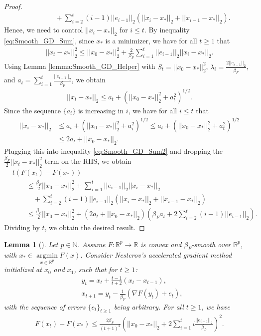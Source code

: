 \documentclass{article}
\newtheorem{lemma}{Lemma}
\begin{document}
\begin{proof}
\begin{align}
& \qquad \quad + \sum_{i = 2}^t(i - 1)||e_{i - 1}||_2(||x_i - x_*||_2 + ||x_{i - 1} - x_*||_2).
\end{align}
Hence, we need to control $||x_i - x_*||_2$ for $i \leq t$. By inequality \eqref{eq:Smooth_GD_Sum}, since $x_*$ is a minimizer, we have for all $t \geq 1$ that
\begin{align*}
||x_t - x_*||_2^2 \leq ||x_0 - x_*||_2^2 + \frac{2}{\beta_F}\sum_{i = 1}^t||e_{i - 1}||_2||x_i - x_*||_2. 
\end{align*}
Using Lemma \ref{lemma:Smooth_GD_Helper} with $S_t = ||x_0 - x_*||_2^2$,  $\lambda_i = \frac{2||e_{i - 1}||_2}{\beta_F}$, and $a_t = \sum_{i = 1}^t\frac{||e_{i - 1}||_2}{\beta_F}$, we obtain
\begin{align*}
||x_t - x_*||_2 \leq a_t + \left(||x_0 - x_*||_2^2 + a_t^2\right)^{1/2}.
\end{align*}
Since the sequence $\{a_i\}$ is increasing in $i$, we have for all $i \leq t$ that
\begin{align*}
||x_i - x_*||_2 &\leq a_i + \left(||x_0 - x_*||_2^2 + a_i^2\right)^{1/2} \leq a_t + \left(||x_0 - x_*||_2^2 + a_t^2\right)^{1/2}\\
&\leq 2a_t + ||x_0 - x_*||_2.
\end{align*}
Plugging this into inequality \eqref{eq:Smooth_GD_Sum2} and dropping the $\frac{\beta_F}{2}||x_t - x_*||_2^2$ term on the RHS, we obtain
\begin{align*}
& t(F(x_t) - F(x_*)) \\
%
& \qquad \leq \frac{\beta_F}{2}||x_0 - x_*||_2^2 + \sum_{i = 1}^t||e_{i - 1}||_2||x_i - x_*||_2\\
& \qquad \quad + \sum_{i = 2}^t(i - 1)||e_{i - 1}||_2(||x_i - x_*||_2 + ||x_{i - 1} - x_*||_2)\\
& \qquad \leq \frac{\beta_F}{2}||x_0 - x_*||_2^2 + (2a_t + ||x_0 - x_*||_2)\left(\beta_Fa_t + 2\sum_{i = 2}^t(i - 1)||e_{i - 1}||_2\right).
\end{align*}
Dividing by $t$, we obtain the desired result.
\end{proof}

\begin{lemma}[\cite{Schmidt_2011_Conv}]
\label{lemma:Inexact_AGD_lemma}
Let $p \in \mathbb{N}$. Assume $F : \mathbb{R}^p \rightarrow \mathbb{R}$ is convex and $\beta_F$-smooth over $\mathbb{R}^p$, with $x_* \in \mathop{\arg\min}\limits_{x \in \mathbb{R}^p}F(x)$. Consider Nesterov's accelerated gradient method initialized at $x_0$ and $x_1$, such that for $t \geq 1$:
\begin{align*}
&y_t = x_t + \frac{t - 1}{t + 2}(x_t - x_{t - 1}),\\
&x_{t + 1} = y_t - \frac{1}{\beta_F}(\nabla F(y_t) + e_t),
\end{align*}
with the sequence of errors $\{e_{t}\}_{t \geq 1}$ being arbitrary. For all $t \geq 1$, we have
\begin{align*}
F(x_t) - F(x_*) \leq \frac{2\beta_F}{(t + 1)^2}\left(||x_0 - x_*||_2 + 2\sum_{i = 1}^ti\frac{||e_{i - 1}||_2}{\beta_L}\right)^2.
\end{align*}
\end{lemma}
\end{document}

